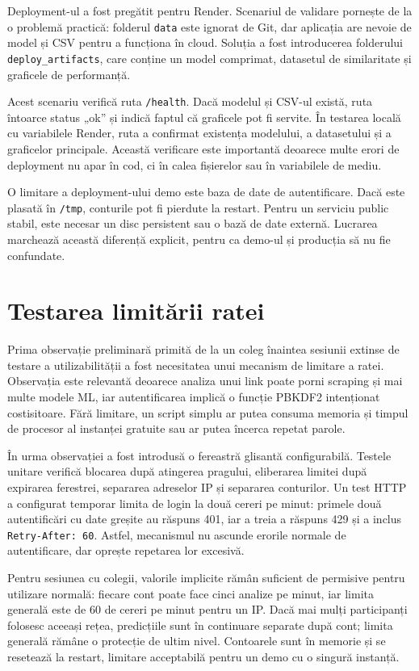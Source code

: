 Deployment-ul a fost pregătit pentru Render. Scenariul de validare pornește de la o problemă practică: folderul \texttt{data} este ignorat de Git, dar aplicația are nevoie de model și CSV pentru a funcționa în cloud. Soluția a fost introducerea folderului \texttt{deploy\_artifacts}, care conține un model comprimat, datasetul de similaritate și graficele de performanță.

Acest scenariu verifică ruta \texttt{/health}. Dacă modelul și CSV-ul există, ruta întoarce status „ok” și indică faptul că graficele pot fi servite. În testarea locală cu variabilele Render, ruta a confirmat existența modelului, a datasetului și a graficelor principale. Această verificare este importantă deoarece multe erori de deployment nu apar în cod, ci în calea fișierelor sau în variabilele de mediu.

O limitare a deployment-ului demo este baza de date de autentificare. Dacă este plasată în \texttt{/tmp}, conturile pot fi pierdute la restart. Pentru un serviciu public stabil, este necesar un disc persistent sau o bază de date externă. Lucrarea marchează această diferență explicit, pentru ca demo-ul și producția să nu fie confundate.

\section{Testarea limitării ratei}
\label{sec:case-rate-limit}

Prima observație preliminară primită de la un coleg înaintea sesiunii extinse de testare a utilizabilității a fost necesitatea unui mecanism de limitare a ratei. Observația este relevantă deoarece analiza unui link poate porni scraping și mai multe modele ML, iar autentificarea implică o funcție PBKDF2 intenționat costisitoare. Fără limitare, un script simplu ar putea consuma memoria și timpul de procesor al instanței gratuite sau ar putea încerca repetat parole.

În urma observației a fost introdusă o fereastră glisantă configurabilă. Testele unitare verifică blocarea după atingerea pragului, eliberarea limitei după expirarea ferestrei, separarea adreselor IP și separarea conturilor. Un test HTTP a configurat temporar limita de login la două cereri pe minut: primele două autentificări cu date greșite au răspuns 401, iar a treia a răspuns 429 și a inclus \texttt{Retry-After: 60}. Astfel, mecanismul nu ascunde erorile normale de autentificare, dar oprește repetarea lor excesivă.

Pentru sesiunea cu colegii, valorile implicite rămân suficient de permisive pentru utilizare normală: fiecare cont poate face cinci analize pe minut, iar limita generală este de 60 de cereri pe minut pentru un IP. Dacă mai mulți participanți folosesc aceeași rețea, predicțiile sunt în continuare separate după cont; limita generală rămâne o protecție de ultim nivel. Contoarele sunt în memorie și se resetează la restart, limitare acceptabilă pentru un demo cu o singură instanță.

